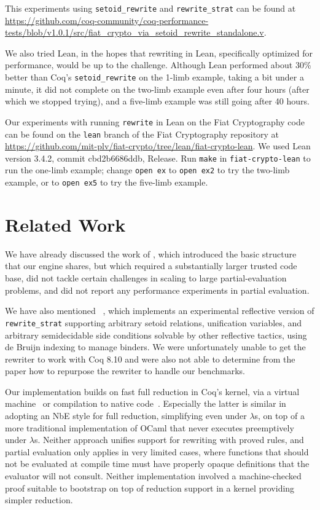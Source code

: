 This experiments using \verb|setoid_rewrite| and \verb|rewrite_strat| can be found at \url{https://github.com/coq-community/coq-performance-tests/blob/v1.0.1/src/fiat_crypto_via_setoid_rewrite_standalone.v}.

We also tried Lean, in the hopes that rewriting in Lean, specifically optimized for performance, would be up to the challenge.
Although Lean performed about 30\% better than Coq's \texttt{setoid\_rewrite} on the 1-limb example, taking a bit under a minute, it did not complete on the two-limb example even after four hours (after which we stopped trying), and a five-limb example was still going after 40 hours.

Our experiments with running \texttt{rewrite} in Lean on the Fiat Cryptography code can be found on the \texttt{lean} branch of the Fiat Cryptography repository at \url{https://github.com/mit-plv/fiat-crypto/tree/lean/fiat-crypto-lean}.
We used Lean version 3.4.2, commit cbd2b6686ddb, Release.
Run \texttt{make} in \texttt{fiat-crypto-lean} to run the one-limb example;
change \texttt{open ex} to \texttt{open ex2} to try the two-limb example, or to \texttt{open ex5} to try the five-limb example.

\section{Related Work}\label{sec:related}

We have already discussed the work of \textcite{Aehlig}, which introduced the basic structure that our engine shares, but which required a substantially larger trusted code base, did not tackle certain challenges in scaling to large partial-evaluation problems, and did not report any performance experiments in partial evaluation.

We have also mentioned \Rtac{}~\cite{rtac}, which implements an experimental reflective version of \texttt{rewrite\_strat} supporting arbitrary setoid relations, unification variables, and arbitrary semidecidable side conditions solvable by other reflective tactics, using de Bruijn indexing to manage binders.
We were unfortunately unable to get the rewriter to work with Coq 8.10 and were also not able to determine from the paper how to repurpose the rewriter to handle our benchmarks.

Our implementation builds on fast full reduction in Coq's kernel, via a virtual machine~\cite{vmcompute} or compilation to native code~\cite{nativecompute}.
Especially the latter is similar in adopting an NbE style for full reduction, simplifying even under $\lambda$s, on top of a more traditional implementation of OCaml that never executes preemptively under $\lambda$s.
Neither approach unifies support for rewriting with proved rules, and partial evaluation only applies in very limited cases, where functions that should not be evaluated at compile time must have properly opaque definitions that the evaluator will not consult.
Neither implementation involved a machine-checked proof suitable to bootstrap on top of reduction support in a kernel providing simpler reduction.

